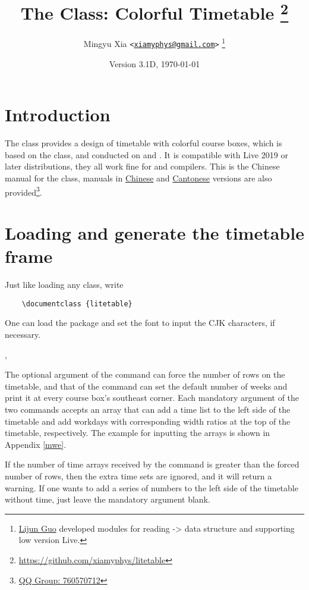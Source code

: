 \documentclass[letterpaper]{l3doc}
\title
{
  \bfseries
  The \cls{litetable} Class: Colorful Timetable
  \thanks{\url{https://github.com/xiamyphys/litetable}}
}
\author
{
  Mingyu Xia \texttt{<\href{mailto:xiamyphys@gmail.com}{xiamyphys@gmail.com}>}
  \thanks{\href{https://github.com/ljguo1020}{Lijun Guo} developed modules for reading \meta{left} -> \meta{right} data structure and supporting low version \hologo {TeX} Live.}
}
\date{Version 3.1D, \today}
\begin{document}
\maketitle

\section{Introduction}

The  class provides a design of timetable with colorful course boxes, which is based on the  class, and conducted on  and . It is compatible with Live 2019 or later distributions, they all work fine for  and  compilers. This is the Chinese manual for the  class, manuals in \href{./litetable-cn.pdf}{Chinese} and \href{./litetable-hk.pdf}{Cantonese} versions are also provided\footnote{\href{https://qm.qq.com/q/RyssAhG4qy}{QQ Group: 760570712}}.

\section{Loading  and generate the timetable frame}

Just like loading any class, write

\begin{framed}
  \begin{verbatim}
    \documentclass {litetable}
  \end{verbatim}
\end{framed}

One can load the  package and set the font to input the CJK characters, if necessary.

\begin{function}{\timelist,\weeklist}
  \begin{syntax}
                    
           
  \end{syntax}

  The optional argument of the command  can force the number of rows on the timetable, and that of the command  can set the default number of weeks and print it at every course box's southeast corner. Each mandatory argument of the two commands accepts an array that can add a time list to the left side of the timetable and add workdays with corresponding width ratios at the top of the timetable, respectively. The example for inputting the arrays is shown in Appendix \ref{mwe}.

  If the number of time arrays received by the command  is greater than the forced number of rows, then the extra time sets are ignored, and it will return a warning. If one wants to add a series of numbers to the left side of the timetable without time, just leave the mandatory argument blank.
\end{function}
\end{document}
